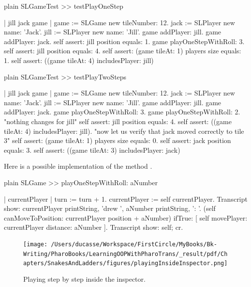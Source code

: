 \documentclass[10pt,twoside,english]{_support/latex/sbabook/sbabook}
\begin{document}
\begin{displaycode}{plain}
SLGameTest >> testPlayOneStep
	
	| jill jack game |
	game := SLGame new tileNumber: 12.
	jack := SLPlayer new name: 'Jack'.
	jill := SLPlayer new name: 'Jill'.
	game addPlayer: jill.
	game addPlayer: jack.
	self assert: jill position equals: 1.
	game playOneStepWithRoll: 3.
	self assert: jill position equals: 4.
	self assert: (game tileAt: 1) players size equals: 1.
	self assert: ((game tileAt: 4) includesPlayer: jill)
\end{displaycode}

	

\begin{displaycode}{plain}
SLGameTest >> testPlayTwoSteps
	
	| jill jack game |
	game := SLGame new tileNumber: 12.
	jack := SLPlayer new name: 'Jack'.
	jill := SLPlayer new name: 'Jill'.
	game addPlayer: jill.
	game addPlayer: jack.
	game playOneStepWithRoll: 3.
	game playOneStepWithRoll: 2.
	"nothing changes for jill"
	self assert: jill position equals: 4.
	self assert: ((game tileAt: 4) includesPlayer: jill).
	"now let us verify that jack moved correctly to tile 3"	
	self assert: (game tileAt: 1) players size equals: 0.
	self assert: jack position equals: 3.
	self assert: ((game tileAt: 3) includesPlayer: jack)
\end{displaycode}

	
Here is a possible implementation of the method . 

\begin{displaycode}{plain}
SLGame >> playOneStepWithRoll: aNumber
		
	| currentPlayer |
	turn := turn + 1.
	currentPlayer := self currentPlayer. 
	Transcript show: currentPlayer printString, 'drew ', aNumber printString, ': '. 
	(self canMoveToPosition: currentPlayer position + aNumber)
		ifTrue: [ self movePlayer: currentPlayer distance: aNumber ].
	Transcript show: self; cr.
\end{displaycode}


\begin{figure}

\begin{center}
\texttt{[image: /Users/ducasse/Workspace/FirstCircle/MyBooks/Bk-Writing/PharoBooks/LearningOOPWithPharoTrans/\_result/pdf/Chapters/SnakesAndLadders/figures/playingInsideInspector.png]}\caption{Playing step by step inside the inspector.\label{fig:playingInsideInspector}}\end{center}
\end{figure}
\end{document}
